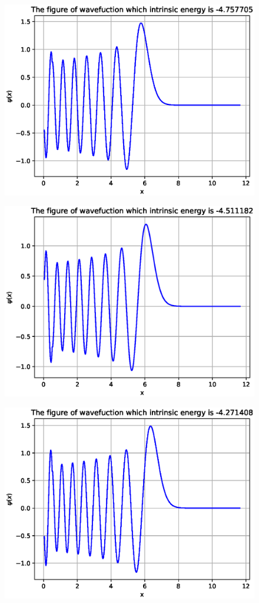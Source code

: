 \documentclass[twoside,twocolumn]{article}
\begin{document}
\begin{CJK*}{UTF8}{gkai}
\begin{figure}
	\label{fig:13}
\end{figure}
\begin{figure}
	\centering
	\includegraphics[width=0.9\linewidth]{figure/14}
	\label{fig:14}
\end{figure}
\begin{figure}
	\centering
	\includegraphics[width=0.9\linewidth]{figure/15}
	\label{fig:15}
\end{figure}
\begin{figure}
	\centering
	\includegraphics[width=0.9\linewidth]{figure/16}

\end{figure}
\end{CJK*}
\end{document}
